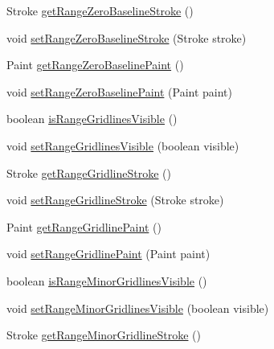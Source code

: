 \begin{DoxyCompactItemize}
Stroke \mbox{\hyperlink{classorg_1_1jfree_1_1chart_1_1plot_1_1_category_plot_a6f347b53454425e0038114bff25b9ece}{get\+Range\+Zero\+Baseline\+Stroke}} ()
\item 
void \mbox{\hyperlink{classorg_1_1jfree_1_1chart_1_1plot_1_1_category_plot_a9a31e7897f3b93d1bd8b77e2c35ca08b}{set\+Range\+Zero\+Baseline\+Stroke}} (Stroke stroke)
\item 
Paint \mbox{\hyperlink{classorg_1_1jfree_1_1chart_1_1plot_1_1_category_plot_aa8276ead4325ef7f44f3d138bb8ef23e}{get\+Range\+Zero\+Baseline\+Paint}} ()
\item 
void \mbox{\hyperlink{classorg_1_1jfree_1_1chart_1_1plot_1_1_category_plot_afd2285041f0d986fe129e3c00df3cfe8}{set\+Range\+Zero\+Baseline\+Paint}} (Paint paint)
\item 
boolean \mbox{\hyperlink{classorg_1_1jfree_1_1chart_1_1plot_1_1_category_plot_a31df08c763e3a5318983fa25ffad923c}{is\+Range\+Gridlines\+Visible}} ()
\item 
void \mbox{\hyperlink{classorg_1_1jfree_1_1chart_1_1plot_1_1_category_plot_a7430d1f431ac052d95edf4f6b516aea7}{set\+Range\+Gridlines\+Visible}} (boolean visible)
\item 
Stroke \mbox{\hyperlink{classorg_1_1jfree_1_1chart_1_1plot_1_1_category_plot_ae6769196c3c8bad1d58e293103ccc3ea}{get\+Range\+Gridline\+Stroke}} ()
\item 
void \mbox{\hyperlink{classorg_1_1jfree_1_1chart_1_1plot_1_1_category_plot_a108f18f155e590c12c0432d06eeab155}{set\+Range\+Gridline\+Stroke}} (Stroke stroke)
\item 
Paint \mbox{\hyperlink{classorg_1_1jfree_1_1chart_1_1plot_1_1_category_plot_abb4101febf21c1537aecd57c3a524250}{get\+Range\+Gridline\+Paint}} ()
\item 
void \mbox{\hyperlink{classorg_1_1jfree_1_1chart_1_1plot_1_1_category_plot_a8bbe8561afac2e8f929844c173f9d93b}{set\+Range\+Gridline\+Paint}} (Paint paint)
\item 
boolean \mbox{\hyperlink{classorg_1_1jfree_1_1chart_1_1plot_1_1_category_plot_a92a64a1079b22962279cb676a7b4d10c}{is\+Range\+Minor\+Gridlines\+Visible}} ()
\item 
void \mbox{\hyperlink{classorg_1_1jfree_1_1chart_1_1plot_1_1_category_plot_ac8ee0242646ffadffb2cdfc8ac64a14a}{set\+Range\+Minor\+Gridlines\+Visible}} (boolean visible)
\item 
Stroke \mbox{\hyperlink{classorg_1_1jfree_1_1chart_1_1plot_1_1_category_plot_aecf2eb95c22f637734856931ed842527}{get\+Range\+Minor\+Gridline\+Stroke}} ()
\item 

\end{DoxyCompactItemize}
